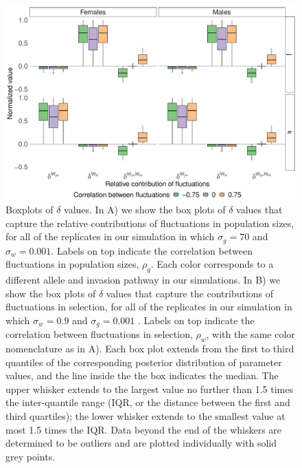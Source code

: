 \documentclass[12pt]{article}
\begin{document}
\begin{figure}[H]
  \centerline{\includegraphics[width=1\textwidth]{box_plots_selection.pdf}}
  \caption{ Boxplots of $\delta$ values. In A) we show the box plots of $\delta$ values that capture the relative contributions of fluctuations in population sizes, for all of the replicates in our simulation in which $\sigma_{g}=70$ and $\sigma_{w}=0.001$. Labels on top indicate the correlation between fluctuations in population sizes, $\rho_{g}$. Each color corresponds to a different allele and invasion pathway in our simulations. In B) we show the box plots of $\delta$ values that capture the contributions of fluctuations in selection, for all of the replicates in our simulation in which $\sigma_{w}=0.9$ and $\sigma_{g}=0.001$ . Labels on top indicate the correlation between fluctuations in selection, $\rho_{w}$, with the same color nomenclature as in A). Each box plot extends from the first to third quantiles of the corresponding posterior distribution of parameter values, and the line inside the the box indicates the median. The upper whisker extends to the largest value no further than 1.5 times the inter-quantile range (IQR, or the distance between the first and third quartiles); the lower whisker extends to the smallest value at most 1.5 times the IQR. Data beyond the end of the whiskers are determined to be outliers and are plotted individually with solid grey points.   }
    \label{fig:boxes_selection}
\end{figure}
\end{document}
